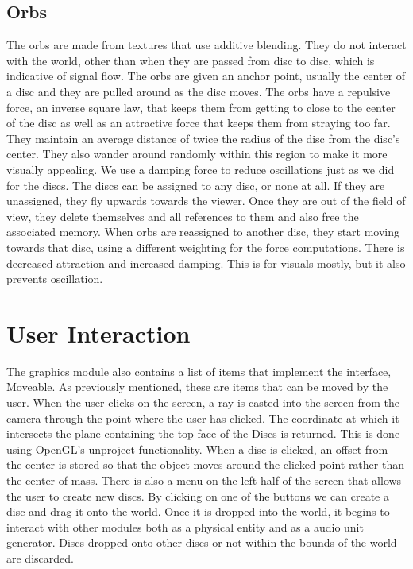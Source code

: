 \documentclass[pdftext,twoside,10pt]{article}
\begin{document}
\subsection{Orbs}
The orbs are made from textures that use additive blending. They do not interact with the world, other than when they are passed from disc to disc, which is indicative of signal flow. The orbs are given an anchor point, usually the center of a disc and they are pulled around as the disc moves. The orbs have a repulsive force, an inverse square law, that keeps them from getting to close to the center of the disc as well as an attractive force that keeps them from straying too far. They maintain an average distance of twice the radius of the disc from the disc's center. They also wander around randomly within this region to make it more visually appealing. We use a damping force to reduce oscillations just as we did for the discs. The discs can be assigned to any disc, or none at all. If they are unassigned, they fly upwards towards the viewer. Once they are out of the field of view, they delete themselves and all references to them and also free the associated memory. When orbs are reassigned to another disc, they start moving towards that disc, using a different weighting for the force computations. There is decreased attraction and increased damping. This is for visuals mostly, but it also prevents oscillation.

\vspace{1cm}


\section{User Interaction}
The graphics module also contains a list of items that implement the interface, Moveable. As previously mentioned, these are items that can be moved by the user. When the user clicks on the screen, a ray is casted into the screen from the camera through the point where the user has clicked. The coordinate at which it intersects the plane containing the top face of the Discs is returned. This is done using OpenGL's unproject functionality. When a disc is clicked, an offset from the center is stored so that the object moves around the clicked point rather than the center of mass. There is also a menu on the left half of the screen that allows the user to create new discs. By clicking on one of the buttons we can create a disc and drag it onto the world. Once it is dropped into the world, it begins to interact with other modules both as a physical entity and as a audio unit generator. Discs dropped onto other discs or not within the bounds of the world are discarded.
\end{document}
